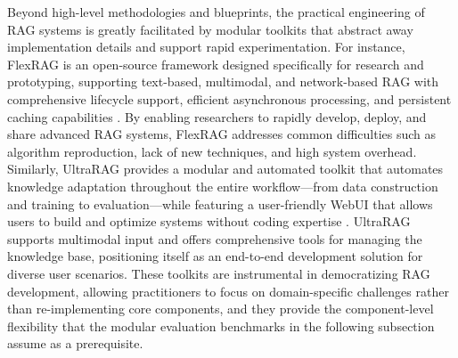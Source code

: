 \documentclass[11pt]{article}
\begin{document}
Beyond high-level methodologies and blueprints, the practical engineering of RAG systems is greatly facilitated by modular toolkits that abstract away implementation details and support rapid experimentation. For instance, FlexRAG is an open-source framework designed specifically for research and prototyping, supporting text-based, multimodal, and network-based RAG with comprehensive lifecycle support, efficient asynchronous processing, and persistent caching capabilities \cite{ref575}. By enabling researchers to rapidly develop, deploy, and share advanced RAG systems, FlexRAG addresses common difficulties such as algorithm reproduction, lack of new techniques, and high system overhead. Similarly, UltraRAG provides a modular and automated toolkit that automates knowledge adaptation throughout the entire workflow---from data construction and training to evaluation---while featuring a user-friendly WebUI that allows users to build and optimize systems without coding expertise \cite{ref576}. UltraRAG supports multimodal input and offers comprehensive tools for managing the knowledge base, positioning itself as an end-to-end development solution for diverse user scenarios. These toolkits are instrumental in democratizing RAG development, allowing practitioners to focus on domain-specific challenges rather than re-implementing core components, and they provide the component-level flexibility that the modular evaluation benchmarks in the following subsection assume as a prerequisite.
\end{document}
